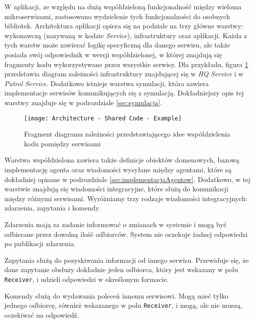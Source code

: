 \par W aplikacji, ze względu na dużą współdzieloną funkcjonalność między wieloma mikroserwisami, zastosowano wydzielenie tych funkcjonalności do osobnych bibliotek. Architektura aplikacji opiera się na podziale na trzy główne warstwy: wykonawczą (nazywaną w kodzie \emph{Service}), infrastruktury oraz aplikacji. Każda z tych warstw może zawierać logikę specyficzną dla danego serwisu, ale także posiada swój odpowiednik w wersji współdzielonej, w której znajdują się fragmenty kodu wykorzystywane przez wszystkie serwisy. Dla przykładu, figura \ref{fig:architectureSharedCodeExample} przedstawia diagram zależności infrastruktury znajdującej się w \emph{HQ Service} i w \emph{Patrol Service}. Dodatkowo istnieje warstwa symulacji, która zawiera implementacje serwisów komunikujących się z symulacją. Dokładniejszy opis tej warstwy znajduje się w podrozdziale \ref{sec:symulacja}.

\begin{figure}
    \centering
    \texttt{[image: Architecture - Shared Code - Example]}
    \caption{Fragment diagramu zależności przedstawiającego idee współdzielenia kodu pomiędzy serwisami}
    \label{fig:architectureSharedCodeExample}
\end{figure}

\par Warstwa współdzielona zawiera także definicje obiektów domenowych, bazową implementację agenta oraz wiadomości wysyłane między agentami, które są dokładniej opisane w podrozdziale \ref{sec:implementacjaAgentow}. Dodatkowo, w tej warstwie znajdują się wiadomości integracyjne, które służą do komunikacji między różnymi serwisami. Wyróżniamy trzy rodzaje wiadomości integracyjnych: zdarzenia, zapytania i komendy.

\par Zdarzenia mają za zadanie informować o zmianach w systemie i mogą być odbierane przez dowolną ilość odbiorców. System nie oczekuje żadnej odpowiedzi po publikacji zdarzenia.

\par Zapytania służą do pozyskiwania informacji od innego serwisu. Przewiduje się, że dane zapytanie obsłuży dokładnie jeden odbiorca, który jest wskazany w polu \texttt{Receiver}, i udzieli odpowiedzi w określonym formacie.

\par Komendy służą do wydawania poleceń innemu serwisowi. Mogą mieć tylko jednego odbiorcę, również wskazanego w polu \texttt{Receiver}, i mogą, ale nie muszą, oczekiwać na odpowiedź.

